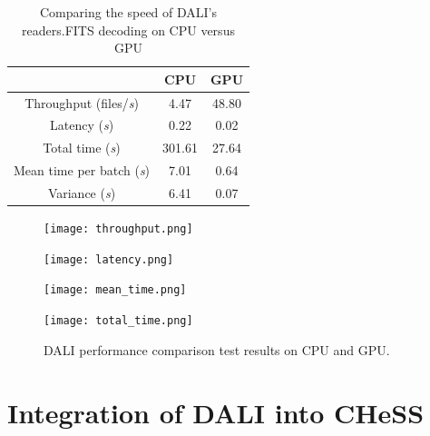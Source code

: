 \documentclass[licencjacka,en]{pracamgr}
\begin{document}
\renewcommand{\arraystretch}{2}
\begin{table}[H]
    \centering
    \begin{tabular}{|c|c|c|}
        \hline
        & CPU & GPU \\\hline
        Throughput (files/\textit{s}) & 4.47 & 48.80 \\\hline
        Latency (\textit{s}) & 0.22 & 0.02 \\\hline
        Total time (\textit{s}) & 301.61 & 27.64 \\\hline
        Mean time per batch (\textit{s}) & 7.01 & 0.64 \\\hline
        Variance (\textit{s}) & 6.41 & 0.07 \\\hline
    \end{tabular}
    \caption{\label{CPUvsGPU} Comparing the speed of DALI's readers.FITS decoding on CPU versus GPU}
\end{table}

\begin{figure}[htbp]
    \centering
    \vspace{1cm} %
    \begin{minipage}{.45\textwidth}
        \centering
        \texttt{[image: throughput.png]}
    \end{minipage}\hfill
    \begin{minipage}{.45\textwidth}
        \centering
        \texttt{[image: latency.png]}
    \end{minipage}

    \vspace{1cm} %
    
    \begin{minipage}{.45\textwidth}
        \centering
        \texttt{[image: mean\_time.png]}
    \end{minipage}\hfill
    \begin{minipage}{.45\textwidth}
        \centering
        \texttt{[image: total\_time.png]}
    \end{minipage}
    \caption{DALI performance comparison test results on CPU and GPU.}
    \label{CPUvsGPUjpeg}
\end{figure}





\section{\label{chess}Integration of DALI into CHeSS}
\end{document}
